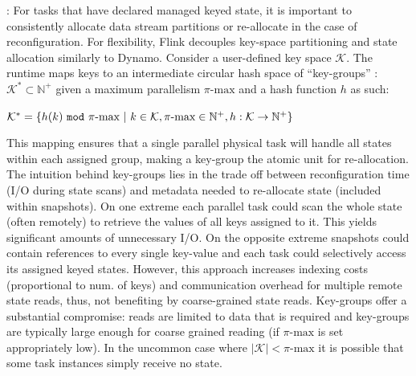 : For tasks that have declared managed keyed state, it is important to consistently allocate data stream partitions or re-allocate in the case of reconfiguration. For flexibility, Flink decouples key-space partitioning and state allocation similarly to Dynamo\cite{decandia2007dynamo}. Consider a user-defined key space $\mathcal{K}$. The runtime maps keys to an intermediate circular hash space of ``key-groups'' : $\mathcal{K}^* \subset \mathbb{N^+}$ given a maximum parallelism $\pi\text{-max}$ and a hash function $h$ as such:

\noindent $\mathcal{K}^* = \{ h(k)\text{ \texttt{mod} }\pi\text{-max}\text{ }|\text{ }k \in \mathcal{K}, \pi\text{-max} \in \mathbb{N^+}, h: \mathcal{K} \rightarrow \mathbb{N^+} \}$

\noindent This mapping ensures that a single parallel physical task will handle all states within each assigned group, making a key-group the atomic unit for re-allocation. The intuition behind key-groups lies in the trade off between reconfiguration time (I/O during state scans) and metadata needed to re-allocate state (included within snapshots). On one extreme each parallel task could scan the whole state (often remotely) to retrieve the values of all keys assigned to it. This yields significant amounts of unnecessary I/O. 
On the opposite extreme snapshots could contain references to every single key-value and each task could selectively access its assigned keyed states. However, this approach increases indexing costs (proportional to num. of keys) and communication overhead for multiple remote state reads, thus, not benefiting by coarse-grained state reads. Key-groups offer a substantial compromise: reads are limited to data that is required and key-groups are typically large enough for coarse grained reading (if $\pi\text{-max}$ is set appropriately low). In the uncommon case where $|\mathcal{K}| < \pi\text{-max}$ it is possible that some task instances simply receive no state.


